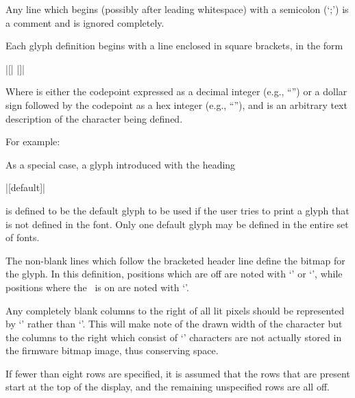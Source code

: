 Any line which begins (possibly after leading whitespace) with a semicolon (`\z;') is a comment and is ignored completely.

Each glyph definition begins with a line enclosed in square brackets, in the form
\begin{center}
	\begin{Coding}
		|[| |]|
	\end{Coding}
\end{center}
Where  is either the codepoint expressed as a decimal integer (e.g., ``'') or
a dollar sign followed by the codepoint as a hex integer (e.g., ``''), and
 is an arbitrary text description of the character being defined.

For example:

As a special case, a glyph introduced with the heading
\begin{center}
	\begin{Coding}
		|[default]|
	\end{Coding}
\end{center}
is defined to be the default glyph to be used if the user
tries to print a glyph that is not defined in the font. Only
one default glyph may be defined in the entire set of fonts.

The non-blank lines which follow the bracketed header line define
the bitmap for the glyph. In this definition, positions which are off
are noted with `' or `\z{|}', while positions where the \led\ is
on are noted with `'.

Any completely blank columns to the right of all lit pixels should be
represented by `\z{|}' rather than `'. This will make note of the drawn
width of the character but the columns to the right which consist of `\z{|}'
characters are not actually stored in the firmware bitmap image, thus conserving
 space.

If fewer than eight rows are specified, it is assumed that the rows that are present
start at the top of the display, and the remaining unspecified rows are all off.

